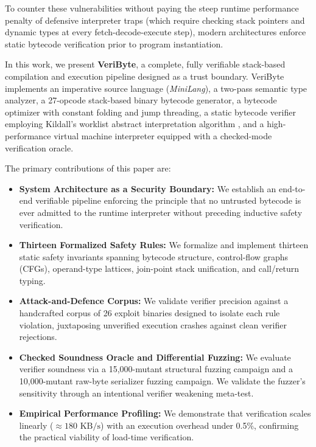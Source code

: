 \documentclass[conference]{IEEEtran}
\begin{document}
To counter these vulnerabilities without paying the steep runtime performance penalty of defensive interpreter traps (which require checking stack pointers and dynamic types at every fetch-decode-execute step), modern architectures enforce static bytecode verification prior to program instantiation. 

In this work, we present \textbf{VeriByte}, a complete, fully verifiable stack-based compilation and execution pipeline designed as a trust boundary. VeriByte implements an imperative source language (\textit{MiniLang}), a two-pass semantic type analyzer, a 27-opcode stack-based binary bytecode generator, a bytecode optimizer with constant folding and jump threading, a static bytecode verifier employing Kildall's worklist abstract interpretation algorithm \cite{kildall1973unified}, and a high-performance virtual machine interpreter equipped with a checked-mode verification oracle.

The primary contributions of this paper are:
\begin{itemize}
    \item \textbf{System Architecture as a Security Boundary:} We establish an end-to-end verifiable pipeline enforcing the principle that no untrusted bytecode is ever admitted to the runtime interpreter without preceding inductive safety verification.
    \item \textbf{Thirteen Formalized Safety Rules:} We formalize and implement thirteen static safety invariants spanning bytecode structure, control-flow graphs (CFGs), operand-type lattices, join-point stack unification, and call/return typing.
    \item \textbf{Attack-and-Defence Corpus:} We validate verifier precision against a handcrafted corpus of 26 exploit binaries designed to isolate each rule violation, juxtaposing unverified execution crashes against clean verifier rejections.
    \item \textbf{Checked Soundness Oracle and Differential Fuzzing:} We evaluate verifier soundness via a 15,000-mutant structural fuzzing campaign and a 10,000-mutant raw-byte serializer fuzzing campaign. We validate the fuzzer's sensitivity through an intentional verifier weakening meta-test.
    \item \textbf{Empirical Performance Profiling:} We demonstrate that verification scales linearly ($\approx 180\text{ KB/s}$) with an execution overhead under 0.5\%, confirming the practical viability of load-time verification.
\end{itemize}
\end{document}
